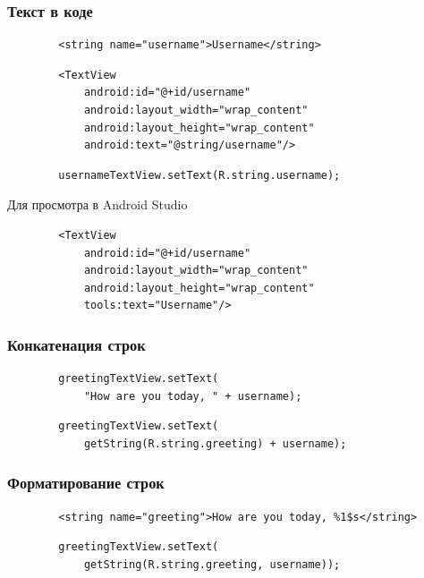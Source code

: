 \documentclass{beamer}
\begin{document}
\begin{frame}[fragile]
    \frametitle{Текст в коде}
    \begin{verbatim}
        <string name="username">Username</string>
    \end{verbatim}
    \begin{verbatim}
        <TextView
            android:id="@+id/username"
            android:layout_width="wrap_content"
            android:layout_height="wrap_content"
            android:text="@string/username"/>
    \end{verbatim}
    \begin{verbatim}
        usernameTextView.setText(R.string.username);
    \end{verbatim}
    Для просмотра в Android Studio
    \begin{verbatim}
        <TextView
            android:id="@+id/username"
            android:layout_width="wrap_content"
            android:layout_height="wrap_content"
            tools:text="Username"/>
    \end{verbatim}
\end{frame}

\begin{frame}[fragile]
    \frametitle{Конкатенация строк}
    \begin{verbatim}
        greetingTextView.setText(
            "How are you today, " + username);
    \end{verbatim}
    \begin{verbatim}
        greetingTextView.setText(
            getString(R.string.greeting) + username);
    \end{verbatim}
\end{frame}

\begin{frame}[fragile]
    \frametitle{Форматирование строк}
    \begin{verbatim}
        <string name="greeting">How are you today, %1$s</string>
    \end{verbatim}
    \begin{verbatim}
        greetingTextView.setText(
            getString(R.string.greeting, username));
    \end{verbatim}
\end{frame}
\end{document}
